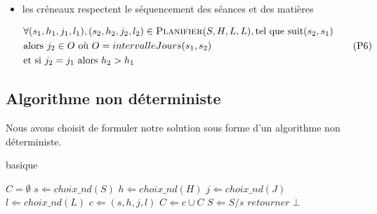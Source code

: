 \begin{itemize}
    \item les créneaux respectent le séquencement des séances et des matières

        \begin{equation}\label{eqn:p6}
            \begin{split}
                & \forall(s_1, h_1, j_1, l_1), (s_2, h_2, j_2, l_2)
                \in \textsc{Planifier}(S, H, L, L),
                \text{tel que} \  \text{suit}(s_2, s_1)\\
                & \text{alors} \  j_2 \in O
                \  \text{où} \  O = intervalleJours(s_1, s_2)\\
                & \text{et si} \  j_2 = j_1 \  \text{alors} \  h_2 > h_1
            \end{split}
            \tag{P6}
        \end{equation}

\end{itemize}

\subsection{Algorithme non déterministe}

Nous avons choisit de formuler notre solution sous forme d'un algorithme non déterministe.

\begin{algorithm}                    
\caption{basique}      
\label{alg1}                           
\begin{algorithmic}                
    \REQUIRE $C = \emptyset$
        \STATE $s \Leftarrow choix\_nd(S)$
        \STATE $h \Leftarrow choix\_nd(H)$
        \STATE $j \Leftarrow choix\_nd(J)$
        \STATE $l \Leftarrow choix\_nd(L)$
        \STATE $c \Leftarrow (s, h, j, l)$
            \STATE $C \Leftarrow c \cup C$
            \STATE $S \Leftarrow S / s$
        \ELSE
            \STATE $retourner \perp$
        \ENDIF
    \ENDWHILE
\end{algorithmic}
\end{algorithm}
